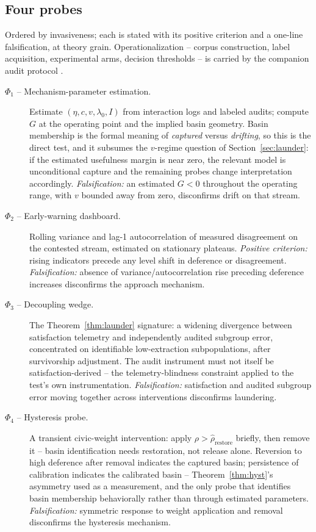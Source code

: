 \documentclass[11pt]{article}
\theoremstyle{definition}
\theoremstyle{remark}
\numberwithin{equation}{section}
\begin{document}
\subsection*{Four probes}
Ordered by invasiveness; each is stated with its positive criterion and a one-line falsification, at theory grain. Operationalization -- corpus construction, label acquisition, experimental arms, decision thresholds -- is carried by the companion audit protocol \citep{hofheinz2026audit}.

\begin{description}
\item[$\Phi_1$ -- Mechanism-parameter estimation.] Estimate $(\eta, c, v, \lambda_0, I)$ from interaction logs and labeled audits; compute $G$ at the operating point and the implied basin geometry. Basin membership is the formal meaning of \emph{captured} versus \emph{drifting}, so this is the direct test, and it subsumes the $v$-regime question of Section~\ref{sec:launder}: if the estimated usefulness margin is near zero, the relevant model is unconditional capture and the remaining probes change interpretation accordingly. \emph{Falsification:} an estimated $G < 0$ throughout the operating range, with $v$ bounded away from zero, disconfirms drift on that stream.
\item[$\Phi_2$ -- Early-warning dashboard.] Rolling variance and lag-1 autocorrelation of measured disagreement on the contested stream, estimated on stationary plateaus. \emph{Positive criterion:} rising indicators precede any level shift in deference or disagreement. \emph{Falsification:} absence of variance/autocorrelation rise preceding deference increases disconfirms the approach mechanism.
\item[$\Phi_3$ -- Decoupling wedge.] The Theorem~\ref{thm:launder} signature: a widening divergence between satisfaction telemetry and independently audited subgroup error, concentrated on identifiable low-extraction subpopulations, after survivorship adjustment. The audit instrument must not itself be satisfaction-derived -- the telemetry-blindness constraint applied to the test's own instrumentation. \emph{Falsification:} satisfaction and audited subgroup error moving together across interventions disconfirms laundering.
\item[$\Phi_4$ -- Hysteresis probe.] A transient civic-weight intervention: apply $\rho > \widehat\rho_{\mathrm{restore}}$ briefly, then remove it -- basin identification needs restoration, not release alone. Reversion to high deference after removal indicates the captured basin; persistence of calibration indicates the calibrated basin -- Theorem~\ref{thm:hyst}'s asymmetry used as a measurement, and the only probe that identifies basin membership behaviorally rather than through estimated parameters. \emph{Falsification:} symmetric response to weight application and removal disconfirms the hysteresis mechanism.
\end{description}
\end{document}
